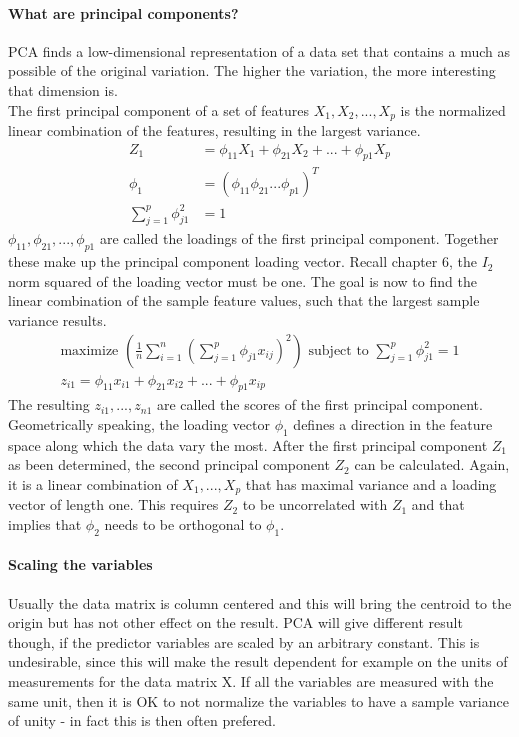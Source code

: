 \documentclass[../document.tex]{subfiles}
\begin{document}
	\paragraph{What are principal components?}
	PCA finds a low-dimensional representation of a data set that contains a much as possible of the original variation. The higher the variation, the more interesting that dimension is.\\
	The first principal component of a set of features \(X_{1},X_{2},...,X_{p}\) is the normalized linear combination of the features, resulting in the largest variance.
	\begin{equation}
	\begin{split}
		Z_{1}&=\phi_{11}X_{1}+\phi_{21}X_{2}+...+\phi_{p1}X_{p}\\
		\phi_{1} &= (\phi_{11} \phi_{21} ... \phi_{p1})^T\\
		\sum_{j=1}^{p}\phi_{j1}^2&=1
	\end{split}
	\end{equation}
	\(\phi_{11}, \phi_{21},...,\phi_{p1}\) are called the loadings of the first principal component. Together these make up the principal component loading vector. Recall chapter 6, the \(I_{2}\) norm squared of the loading vector must be one. The goal is now to find the linear combination of the sample feature values, such that the largest sample variance results. 
	\begin{equation}
	\begin{split}
		\text{maximize }(\frac{1}{n}\sum_{i=1}^{n}(\sum_{j=1}^{p}\phi_{j1}x_{ij})^2)\text{ subject to }\sum_{j=1}^{p}\phi_{j1}^2=1\\
		z_{i1}=\phi_{11}x_{i1}+\phi_{21}x_{i2}+...+\phi_{p1}x_{ip}
	\end{split}
	\end{equation}
	The resulting \(z_{i1},...,z_{n1}\) are called the scores of the first principal component. Geometrically speaking, the loading vector \(\phi_{1}\) defines a direction in the feature space along which the data vary the most. After the first principal component \(Z_{1}\) as been determined, the second principal component \(Z_{2}\) can be calculated. Again, it is a linear combination of \(X_{1},...,X_{p}\) that has maximal variance and a loading vector of length one. This requires \(Z_{2}\) to be uncorrelated with \(Z_{1}\) and that implies that \(\phi_{2}\) needs to be orthogonal to \(\phi_{1}\).
	\paragraph{Scaling the variables}
	Usually the data matrix is column centered and this will bring the centroid to the origin but has not other effect on the result. PCA will give different result though, if the predictor variables are scaled by an arbitrary constant. This is undesirable, since this will make the result dependent for example on the units of measurements for the data matrix X. If all the variables are measured with the same unit, then it is OK to not normalize the variables to have a sample variance of unity - in fact this is then often prefered.
\end{document}
